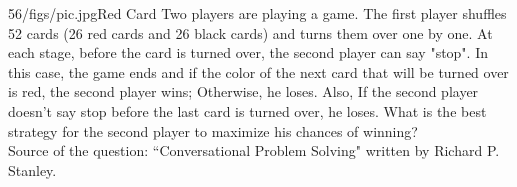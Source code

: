 \begin{problem}{56/figs/pic.jpg}{Red Card}  Two players are playing a game. The first player shuffles 52 cards (26 red cards and 26 black cards) and turns them over one by one. At each stage, before the card is turned over, the second player can say "stop". In this case, the game ends and if the color of the next card that will be turned over is red, the second player wins; Otherwise, he loses. Also, If the second player doesn't say stop before the last card is turned over, he loses. What is the best strategy for the second player to maximize his chances of winning?\\[0.2cm]
	
Source of the question: ``Conversational Problem Solving" written by Richard P. Stanley.
\end{problem}